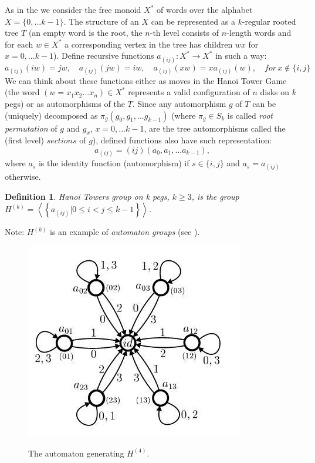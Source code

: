 \documentclass[a4paper,12pt]{amsart}
\newtheorem{definition}{Definition}
\begin{document}
As in the \cite{Hanoi2} we consider the free monoid $X^*$ of words over the alphabet $X = \{0,... k-1\}$.
The structure of an $X$ can be represented as a $k$-regular rooted tree $T$ (an empty word is the root, 
the $n$-th level consists of $n$-length words and for each $w \in X^*$ a corresponding vertex in the 
tree has children $w x$ for $x = 0, ... k-1$). Define recursive functions 
$a_{(ij)} : X^* \rightarrow X^*$ in such a way: 
$$ 
a_{(ij)}(iw) = jw, \quad a_{(ij)}(jw) = iw, \quad a_{(ij)}(xw) = xa_{(ij)}(w), \quad for \, x \notin \{i, j\}
$$
We can think about these functions either as moves in the Hanoi Tower Game (the word 
$(w = x_1 x_2... x_n) \in X^*$ represents a valid configuration of $n$ disks on $k$ pegs) 
or as automorphisms of the $T$. Since any automorphism $g$ of $T$ can be (uniquely)
decomposed as $\pi_g (g_0, g_1, ... g_{k-1})$ (where $\pi_g \in S_{k}$ is called 
\textit{root permutation} of $g$ and $g_x, \, x = 0, ... k-1$, are the tree automorphisms 
called the (first level) $sections$ of $g$), defined functions also have such representation:
$$
a_{(ij)} = (i j) (a_0, a_1, ... a_{k-1}),
$$ 
where $a_s$ is the identity function (automorphism) if $s \in \{i, j\}$ and $a_s = a_{(ij)}$ otherwise.
\\

\begin{definition}
\textit{Hanoi Towers group on k pegs}, $k \ge 3$, is the group 
$H^{(k)} = \left\langle \left\{ a_{(ij)} | 0 \le i < j \le k - 1 \right\}\right\rangle$.
\end{definition}

Note: $H^{(k)}$ is an example of \textit{automaton groups} (see \cite{Auto}).

\begin{figure}[h]
	\centering
	\includegraphics[scale=0.4]{../graphs/automaton_h4.jpg}
	\label{automaton}
	\caption{The automaton generating $H^{(4)}$.}	

\end{figure}
\end{document}

